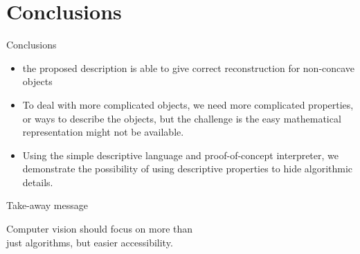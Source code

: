 \documentclass[10pt]{beamer}
\begin{document}
\section{Conclusions}
\begin{frame}{Conclusions}

\begin{itemize}
\item the proposed description is able to give correct reconstruction for non-concave objects
\item To deal with more complicated objects, we need more complicated properties, or ways to describe the objects, but the challenge is the easy mathematical representation might not be available.
\item Using the simple descriptive language and proof-of-concept interpreter, we demonstrate the possibility of using descriptive properties to hide algorithmic details.
\end{itemize}
\end{frame}

\begin{frame}[standout]{Take-away message}

Computer vision should focus on more than \\just algorithms, but easier accessibility.

\end{frame}
\end{document}
